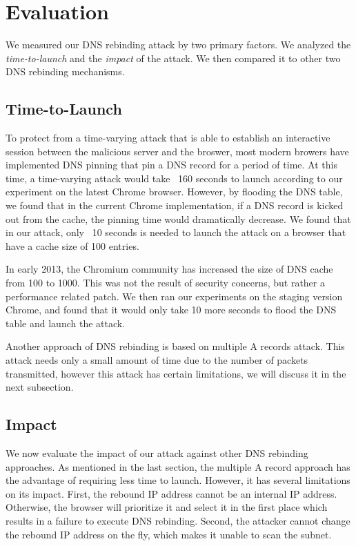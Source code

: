 \section{Evaluation}
\label{sec:eval}
We measured our DNS rebinding attack by two primary factors. We analyzed the \emph{time-to-launch} and the \emph{impact} of the attack. We then compared it to other two DNS rebinding mechanisms. 

\subsection{Time-to-Launch}
To protect from a time-varying attack that is able to establish an interactive session between the malicious server and the broswer, most modern browers have implemented DNS pinning that pin a DNS record for a period of time. At this time, a time-varying attack would take ~160 seconds to launch according to our experiment on the latest Chrome browser. However, by flooding the DNS table, we found that in the current Chrome implementation, if a DNS record is kicked out from the cache, the pinning time would dramatically decrease. We found that in our attack, only ~10 seconds is needed to launch the attack on a browser that have a cache size of 100 entries. 

In early 2013, the Chromium community has increased the size of DNS cache from 100 to 1000. This was not the result of security concerns, but rather a performance related patch. We then ran our experiments on the staging version Chrome, and found that it would only take 10 more seconds to flood the DNS table and launch the attack. 

Another approach of DNS rebinding is based on multiple A records attack. This attack needs only a small amount of time due to the number of packets transmitted, however this attack has certain limitations, we will discuss it in the next subsection.

\subsection{Impact}
We now evaluate the impact of our attack against other DNS rebinding approaches. As mentioned in the last section, the multiple A record approach has the advantage of requiring less time to launch. However, it has several limitations on its impact. First, the rebound IP address cannot be an internal IP address. Otherwise, the browser will prioritize it and select it in the first place which results in a failure to execute DNS rebinding. Second, the attacker cannot change the rebound IP address on the fly, which makes it unable to scan the subnet. 

